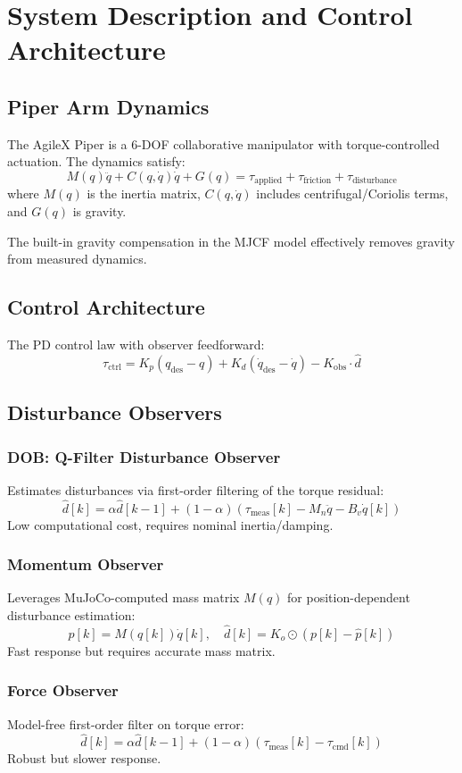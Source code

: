 \section{System Description and Control Architecture}

\subsection{Piper Arm Dynamics}
The AgileX Piper is a 6-DOF collaborative manipulator with torque-controlled actuation. The dynamics satisfy:
\begin{equation}
    M(q) \ddot{q} + C(q,\dot{q}) \dot{q} + G(q) = \tau_{\text{applied}} + \tau_{\text{friction}} + \tau_{\text{disturbance}}
\end{equation}
where $M(q)$ is the inertia matrix, $C(q,\dot{q})$ includes centrifugal/Coriolis terms, and $G(q)$ is gravity.

The built-in gravity compensation in the MJCF model effectively removes gravity from measured dynamics.

\subsection{Control Architecture}
The PD control law with observer feedforward:
\begin{equation}
    \tau_{\text{ctrl}} = K_p (q_{\text{des}} - q) + K_d (\dot{q}_{\text{des}} - \dot{q}) - K_{\text{obs}} \cdot \hat{d}
\end{equation}

\subsection{Disturbance Observers}

\subsubsection{DOB: Q-Filter Disturbance Observer}
Estimates disturbances via first-order filtering of the torque residual:
\begin{equation}
    \hat{d}[k] = \alpha \hat{d}[k-1] + (1-\alpha) \left( \tau_{\text{meas}}[k] - M_n \ddot{q} - B_v \dot{q}[k] \right)
\end{equation}
Low computational cost, requires nominal inertia/damping.

\subsubsection{Momentum Observer}
    Leverages MuJoCo-computed mass matrix $M(q)$ for position-dependent disturbance estimation:
    \begin{equation}
        p[k] = M(q[k]) \dot{q}[k], \quad \hat{d}[k] = K_o \odot (p[k] - \hat{p}[k])
    \end{equation}
    Fast response but requires accurate mass matrix.

\subsubsection{Force Observer}
    Model-free first-order filter on torque error:
    \begin{equation}
        \hat{d}[k] = \alpha \hat{d}[k-1] + (1-\alpha) (\tau_{\text{meas}}[k] - \tau_{\text{cmd}}[k])
    \end{equation}
    Robust but slower response.
